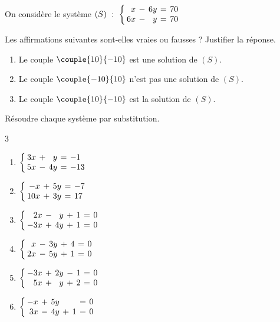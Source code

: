\exo

On considère le système $(S)~:~\left\{\setlength\arraycolsep{2pt}\begin{array}{rcrcl}
x & - & 6y & = & 70 \\
6x & - & y & = & 70
\end{array}\right.$

Les affirmations suivantes sont-elles vraies ou fausses ? Justifier la réponse.
\smallskip
\begin{enumerate}
\item Le couple $\couple{10}{-10}$ est une solution de $(S)$.
\item Le couple $\couple{-10}{10}$ n'est pas une solution de $(S)$.
\item Le couple $\couple{10}{-10}$ est la solution de $(S)$.
\end{enumerate}

\exo

Résoudre chaque système par substitution.
\vspace{-6pt}
\setlength{\columnsep}{1cm}
\setlength{\columnseprule}{0pt}
\begin{multicols}{3}
\begin{enumerate}
\item $\left\{\setlength\arraycolsep{2pt}\begin{array}{rcrcl}
3x & + & y & = & -1 \\
5x & - & 4y & = & -13
\end{array}\right.$
\medskip
\item $\left\{\setlength\arraycolsep{2pt}\begin{array}{rcrcl}
-x & + & 5y & = & -7 \\
10x & + & 3y & = & 17
\end{array}\right.$
\item $\left\{\setlength\arraycolsep{2pt}\begin{array}{rcrcrcl}
2x & - & y & + & 1 & = & 0 \\
-3x & + & 4y & + & 1 & = & 0
\end{array}\right.$
\medskip
\item $\left\{\setlength\arraycolsep{2pt}\begin{array}{rcrcrcl}
x & - & 3y & + & 4 & = & 0 \\
2x & - & 5y & + & 1 & = & 0
\end{array}\right.$
\item $\left\{\setlength\arraycolsep{2pt}\begin{array}{rcrcrcl}
-3x & + & 2y & - & 1 & = & 0 \\
5x & + & y & + & 2 & = & 0
\end{array}\right.$
\medskip
\item $\left\{\setlength\arraycolsep{2pt}\begin{array}{rcrcrcl}
-x & + & 5y &  &  & = & 0 \\
3x & - & 4y & + & 1 & = & 0
\end{array}\right.$
\end{enumerate}
\end{multicols}
\vspace{-6pt}

